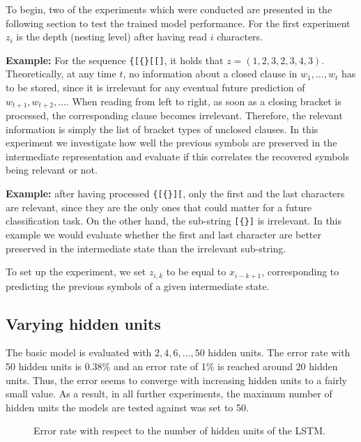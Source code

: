 \documentclass[11pt,a4paper]{article}
\newlength\figureheight
\newlength\figurewidth
\begin{document}
To begin, two of the experiments which were conducted are presented in the following section to test the trained model performance. For the first experiment $z_i$ is the depth (nesting level) after having read $i$ characters.

\textbf{Example:} For the sequence \verb|{[{}[[]|, it holds that $z = (1,2,3,2,3,4,3)$.\\

Theoretically, at any time $t$, no information about a closed clause in $w_1,\ldots, w_t$ has to be stored, since it is irrelevant for any eventual future prediction of $w_{t+1}, w_{t+2},\ldots$. 
When reading from left to right, as soon as a closing bracket is processed, the corresponding clause becomes irrelevant. Therefore, the relevant information is simply the list of bracket types of unclosed clauses. In this experiment we investigate how well the previous symbols are preserved in the intermediate representation and evaluate if this correlates the recovered symbols being relevant or not.

\textbf{Example:} after having processed \verb|{[{}][|, only the first and the last characters are relevant, since they are the only ones that could matter for a future classification task. On the other hand, the sub-string \verb|[{}]| is irrelevant. In this example we would evaluate whether the first and last character are better preserved in the intermediate state than the irrelevant sub-string.

To set up the experiment, we set $z_{i,k}$ to be equal to $x_{i-k+1}$, corresponding to predicting the previous symbols of a given intermediate state.

\subsection{Varying hidden units}
\label{subsec:varying_hidden_units}

The basic model is evaluated with $2,4,6,...,50$ hidden units. The error rate with 50 hidden units is 0.38\% and an error rate of 1\% is reached around 20 hidden units.  Thus, the error seems to converge with increasing hidden units to a fairly small value. As a result, in all further experiments, the maximum number of hidden units the models are tested against was set to 50.

\setlength\figureheight{4cm}
\setlength\figurewidth{\linewidth}
\begin{figure}[ht]
    \caption{Error rate with respect to the number of hidden units of the LSTM.}%
    \label{fig:varying_units_results}%
\end{figure}
\end{document}
